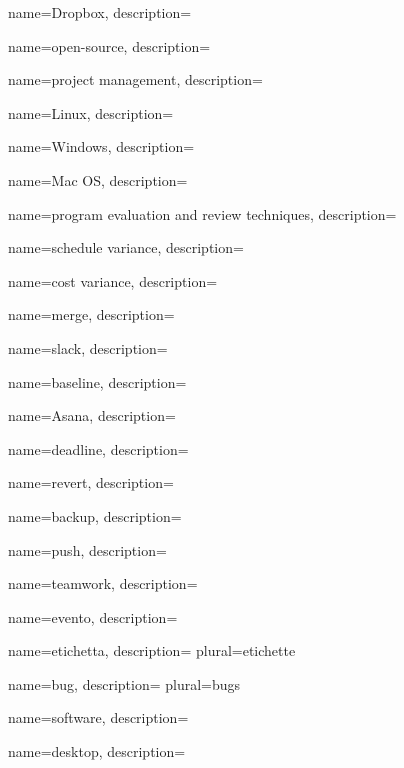  {
	name=Dropbox,
	description={\TODO{}}
}

 {
	name=open-source,
	description={\TODO{}}
}

 {
	name=project management,
	description={\TODO{}}
}

 {
	name=Linux,
	description={\TODO{}}
}

 {
	name=Windows,
	description={\TODO{}}
}

 {
	name=Mac OS,
	description={\TODO{}}
}

 {
	name=program evaluation and review techniques,
	description={\TODO{}}
}

 {
	name=schedule variance,
	description={\TODO{}}
}

 {
	name=cost variance,
	description={\TODO{}}
}


 {
	name=merge,
	description={\TODO{}}
}

 {
	name=slack,
	description={\TODO{}}
}

 {
	name=baseline,
	description={\TODO{}}
}

 {
	name=Asana,
	description={\TODO{}}
}

 {
	name=deadline,
	description={\TODO{}}
}

 {
	name=revert,
	description={\TODO{}}
}

 {
	name=backup,
	description={\TODO{}}
}

 {
	name=push,
	description={\TODO{}}
}

 {
	name=teamwork,
	description={\TODO{}}
}

 {
	name=evento,
	description={\TODO{}}
}

 {
	name=etichetta,
	description={\TODO{}}
	plural=etichette
}

 {
	name=bug,
	description={\TODO{}}
	plural=bugs
}

 {
	name=software,
	description={\TODO{}}
}

 {
	name=desktop,
	description={\TODO{}}
}

